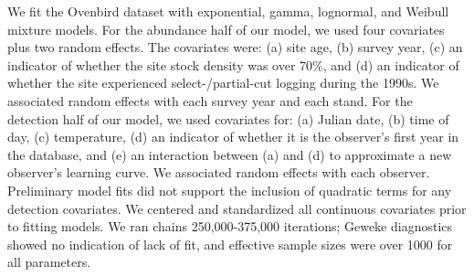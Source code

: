 \documentclass[12pt]{article}
\begin{document}
We fit the Ovenbird dataset with exponential, gamma, lognormal, and Weibull mixture models.  
For the abundance half of our model, we used four covariates plus two random effects.  
The covariates were: (a) site age, (b) survey year, (c) an indicator of whether the site stock density was over 70\%, and (d) an indicator of whether the site experienced select-/partial-cut logging during the 1990s.  
We associated random effects with each survey year and each stand.
For the detection half of our model, we used covariates for: (a) Julian date, (b) time of day, (c) temperature, (d) an indicator of whether it is the observer's first year in the database, and (e) an interaction between (a) and (d) to approximate a new observer's learning curve.  
We associated random effects with each observer.  
Preliminary model fits did not support the inclusion of quadratic terms for any detection covariates.  
We centered and standardized all continuous covariates prior to fitting models.
We ran chains 250,000-375,000 iterations; Geweke diagnostics showed no indication of lack of fit, and effective sample sizes were over 1000 for all parameters.


\end{document}
